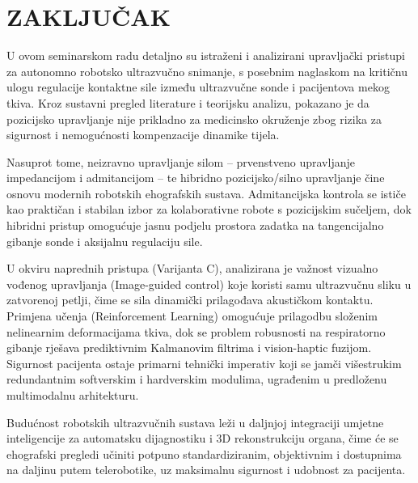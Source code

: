 
\section{ZAKLJUČAK}
\label{sec:zakljucak}

U ovom seminarskom radu detaljno su istraženi i analizirani upravljački pristupi za autonomno robotsko ultrazvučno snimanje, s posebnim naglaskom na kritičnu ulogu regulacije kontaktne sile između ultrazvučne sonde i pacijentova mekog tkiva. Kroz sustavni pregled literature i teorijsku analizu, pokazano je da pozicijsko upravljanje nije prikladno za medicinsko okruženje zbog rizika za sigurnost i nemogućnosti kompenzacije dinamike tijela.

Nasuprot tome, neizravno upravljanje silom -- prvenstveno upravljanje impedancijom i admitancijom -- te hibridno pozicijsko/silno upravljanje čine osnovu modernih robotskih ehografskih sustava. Admitancijska kontrola se ističe kao praktičan i stabilan izbor za kolaborativne robote s pozicijskim sučeljem, dok hibridni pristup omogućuje jasnu podjelu prostora zadatka na tangencijalno gibanje sonde i aksijalnu regulaciju sile.

U okviru naprednih pristupa (Varijanta C), analizirana je važnost vizualno vođenog upravljanja (Image-guided control) koje koristi samu ultrazvučnu sliku u zatvorenoj petlji, čime se sila dinamički prilagođava akustičkom kontaktu. Primjena učenja (Reinforcement Learning) omogućuje prilagodbu složenim nelinearnim deformacijama tkiva, dok se problem robusnosti na respiratorno gibanje rješava prediktivnim Kalmanovim filtrima i vision-haptic fuzijom. Sigurnost pacijenta ostaje primarni tehnički imperativ koji se jamči višestrukim redundantnim softverskim i hardverskim modulima, ugrađenim u predloženu multimodalnu arhitekturu.

Budućnost robotskih ultrazvučnih sustava leži u daljnjoj integraciji umjetne inteligencije za automatsku dijagnostiku i 3D rekonstrukciju organa, čime će se ehografski pregledi učiniti potpuno standardiziranim, objektivnim i dostupnima na daljinu putem telerobotike, uz maksimalnu sigurnost i udobnost za pacijenta.
